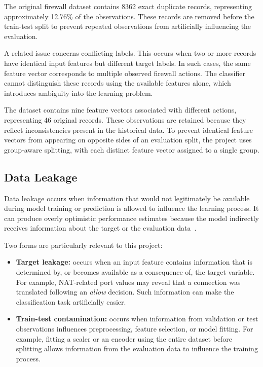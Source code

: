 The original firewall dataset contains \num{8362} exact duplicate records, representing approximately 12.76\% of the observations. These records are removed before the train-test split to prevent repeated observations from artificially influencing the evaluation.

A related issue concerns conflicting labels. This occurs when two or more records have identical input features but different target labels. In such cases, the same feature vector corresponds to multiple observed firewall actions. The classifier cannot distinguish these records using the available features alone, which introduces ambiguity into the learning problem.

The dataset contains nine feature vectors associated with different actions, representing 46 original records. These observations are retained because they reflect inconsistencies present in the historical data. To prevent identical feature vectors from appearing on opposite sides of an evaluation split, the project uses group-aware splitting, with each distinct feature vector assigned to a single group.

\subsection{Data Leakage}

Data leakage occurs when information that would not legitimately be available during model training or prediction is allowed to influence the learning process. It can produce overly optimistic performance estimates because the model indirectly receives information about the target or the evaluation data~\cite{kaufman2012leakage}.

Two forms are particularly relevant to this project:

\begin{itemize}
  \item \textbf{Target leakage:} occurs when an input feature contains information that is determined by, or becomes available as a consequence of, the target variable. For example, NAT-related port values may reveal that a connection was translated following an \emph{allow} decision. Such information can make the classification task artificially easier.
  \item \textbf{Train-test contamination:} occurs when information from validation or test observations influences preprocessing, feature selection, or model fitting. For example, fitting a scaler or an encoder using the entire dataset before splitting allows information from the evaluation data to influence the training process.
\end{itemize}

